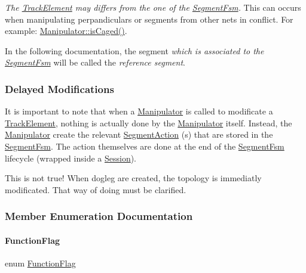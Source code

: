 {\itshape The \hyperlink{classKite_1_1TrackElement}{Track\+Element} may differs from the one of the \hyperlink{classKite_1_1SegmentFsm}{Segment\+Fsm}.} This can occurs when manipulating perpandiculars or segments from other nets in conflict. For example\+: \hyperlink{classKite_1_1Manipulator_a722e514efb92d4a05e4f4d9e1fe7f94b}{Manipulator\+::is\+Caged()}.

In the following documentation, the segment {\itshape which is associated to the \hyperlink{classKite_1_1SegmentFsm}{Segment\+Fsm}} will be called the {\itshape reference segment}.\hypertarget{classKite_1_1Manipulator_secManipDelayed}{}\subsubsection{Delayed Modifications}\label{classKite_1_1Manipulator_secManipDelayed}
It is important to note that when a \hyperlink{classKite_1_1Manipulator}{Manipulator} is called to modificate a \hyperlink{classKite_1_1TrackElement}{Track\+Element}, nothing is actually done by the \hyperlink{classKite_1_1Manipulator}{Manipulator} itself. Instead, the \hyperlink{classKite_1_1Manipulator}{Manipulator} create the relevant \hyperlink{classKite_1_1SegmentAction}{Segment\+Action} (s) that are stored in the \hyperlink{classKite_1_1SegmentFsm}{Segment\+Fsm}. The action themselves are done at the end of the \hyperlink{classKite_1_1SegmentFsm}{Segment\+Fsm} lifecycle (wrapped inside a \hyperlink{classKite_1_1Session}{Session}).

This is not true! When dogleg are created, the topology is immediatly modificated. That way of doing must be clarified. 

\subsubsection{Member Enumeration Documentation}
\mbox{\label{classKite_1_1Manipulator_a2af2ad6b6441614038caf59d04b3b217}} 
\paragraph{\texorpdfstring{Function\+Flag}{FunctionFlag}}
{\footnotesize\ttfamily enum \hyperlink{classKite_1_1Manipulator_a2af2ad6b6441614038caf59d04b3b217}{Function\+Flag}}

